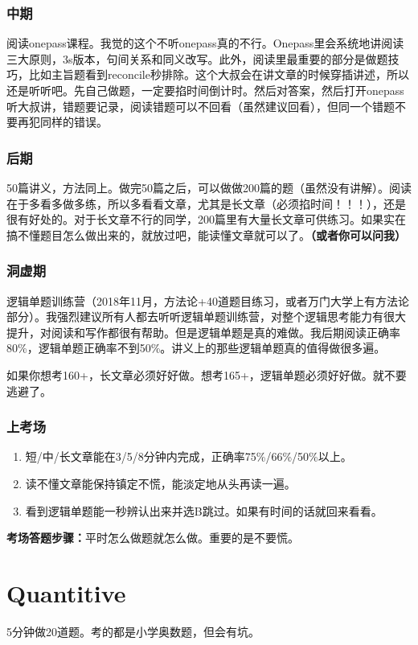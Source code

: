 \documentclass[cn,plain]{./src/qyxfbook}
\begin{document}
\subsection{中期}
阅读onepass课程。我觉的这个不听onepass真的不行。Onepass里会系统地讲阅读三大原则，3s版本，句间关系和同义改写。此外，阅读里最重要的部分是做题技巧，比如主旨题看到reconcile秒排除。这个大叔会在讲文章的时候穿插讲述，所以还是听听吧。先自己做题，一定要掐时间倒计时。然后对答案，然后打开onepass听大叔讲，错题要记录，阅读错题可以不回看（虽然建议回看），但同一个错题不要再犯同样的错误。

\subsection{后期}
50篇讲义，方法同上。做完50篇之后，可以做做200篇的题（虽然没有讲解）。阅读在于多看多做多练，所以多看看文章，尤其是长文章（必须掐时间！！！），还是很有好处的。对于长文章不行的同学，200篇里有大量长文章可供练习。如果实在搞不懂题目怎么做出来的，就放过吧，能读懂文章就可以了。\textbf{（或者你可以问我）}

\subsection{洞虚期}
逻辑单题训练营（2018年11月，方法论+40道题目练习，或者万门大学上有方法论部分）。我强烈建议所有人都去听听逻辑单题训练营，对整个逻辑思考能力有很大提升，对阅读和写作都很有帮助。但是逻辑单题是真的难做。我后期阅读正确率80\%，逻辑单题正确率不到50\%。讲义上的那些逻辑单题真的值得做很多遍。

如果你想考160+，长文章必须好好做。想考165+，逻辑单题必须好好做。就不要逃避了。

\subsection{上考场}
\begin{enumerate}
    \item 短/中/长文章能在3/5/8分钟内完成，正确率75\%/66\%/50\%以上。
    \item 读不懂文章能保持镇定不慌，能淡定地从头再读一遍。
    \item 看到逻辑单题能一秒辨认出来并选B跳过。如果有时间的话就回来看看。
\end{enumerate}

\textbf{考场答题步骤：}平时怎么做题就怎么做。重要的是不要慌。

\chapter{Quantitive}
5分钟做20道题。考的都是小学奥数题，但会有坑。
\end{document}
